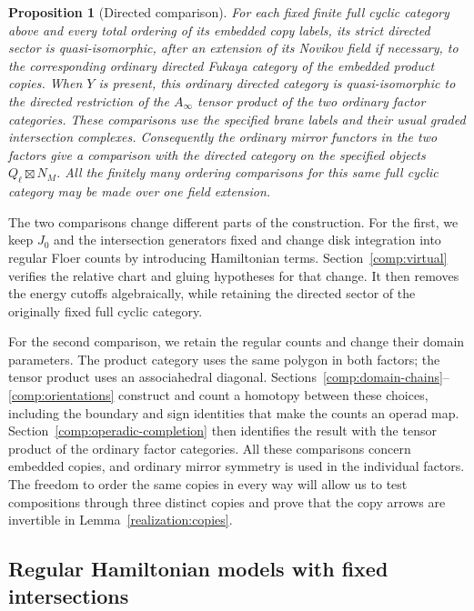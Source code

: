 \documentclass[11pt]{article}
\numberwithin{equation}{section}
\newtheorem{proposition}[theorem]{Proposition}
\theoremstyle{definition}
\theoremstyle{remark}
\begin{document}
\begin{proposition}[Directed comparison]
\label{prop:directed-comparison}\label{prop:comparison}
For each fixed finite full cyclic category above and every total
ordering of its embedded copy labels, its strict directed sector is
quasi-isomorphic, after
an extension of its Novikov field if necessary, to the corresponding
ordinary directed Fukaya category of the embedded product copies.
When $Y$ is present, this ordinary directed category is
quasi-isomorphic to the directed restriction of the $A_\infty$ tensor
product of the two ordinary factor categories.  These comparisons use
the specified brane labels and their usual graded intersection
complexes.  Consequently the ordinary mirror functors in the two
factors give a comparison with the directed category on the specified
objects $Q_\ell\boxtimes N_M$.
All the finitely many ordering comparisons for this same full cyclic
category may be made over one field extension.
\end{proposition}

The two comparisons change different parts of the construction.
For the first, we keep $J_0$ and the intersection generators fixed
and change disk integration into regular Floer counts by introducing
Hamiltonian terms.  Section~\ref{comp:virtual} verifies the relative
chart and gluing hypotheses for that change.  It then removes the
energy cutoffs algebraically, while retaining the directed sector
of the originally fixed full cyclic category.

For the second comparison, we retain the regular counts and change
their domain parameters.  The product category uses the same polygon
in both factors; the tensor product uses an associahedral diagonal.
Sections~\ref{comp:domain-chains}--\ref{comp:orientations} construct
and count a homotopy between these choices, including the boundary
and sign identities that make the counts an operad map.
Section~\ref{comp:operadic-completion} then identifies the result with
the tensor product of the ordinary factor categories.  All these
comparisons concern embedded copies, and ordinary mirror symmetry
is used in the individual factors.  The freedom to order the same
copies in every way will allow us to test compositions through three
distinct copies and prove that the copy arrows are invertible in
Lemma~\ref{realization:copies}.

\subsection{Regular Hamiltonian models with fixed intersections}
\label{comp:regular-models}
\end{document}
